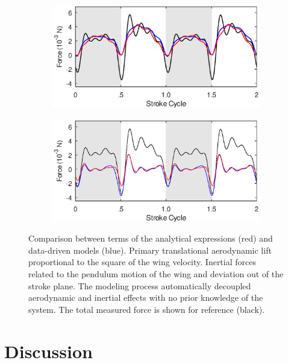 \documentclass[fleqn,10pt]{wlscirep}
\begin{document}
\begin{figure}[ht]
\centering
\begin{subfigure}{0.48\textwidth}
\centering
\includegraphics[width=\textwidth]{figures/eq_comparison_lift}
\caption{\label{fig:eqcomparison_lift}}
\end{subfigure}
\begin{subfigure}{0.48\textwidth}
\centering
\includegraphics[width=\textwidth]{figures/eq_comparison_inertial}
\caption{\label{fig:eqcomparison_inertial}}
\end{subfigure}
\caption{Comparison between terms of the analytical expressions (red) and data-driven models (blue).
   Primary translational aerodynamic lift proportional to the square
  of the wing velocity.  Inertial forces related to the pendulum
  motion of the wing and deviation out of the stroke plane. The modeling process automatically
  decoupled aerodynamic and inertial effects with no prior knowledge of the system. The total
  measured force is shown for reference (black).}
\label{fig:eqcomparison}
\end{figure}

\section*{Discussion}
\end{document}
